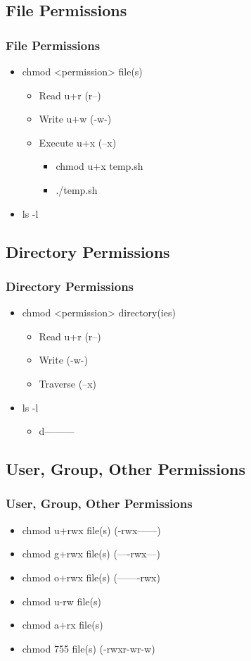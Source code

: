 \documentclass[hyperref={pdfpagelabels=false}]{beamer}
\begin{document}
\subsection{File Permissions}
\frame
{
    \frametitle{File Permissions}
    \begin{itemize}
    \item{chmod <permission> file(s)}
        \begin{itemize}
        \item{Read u+r (r--)}
        \item{Write u+w (-w-)}
        \item{Execute u+x (--x)}
            \begin{itemize}
            \item{chmod u+x temp.sh}
            \item{./temp.sh}
            \end{itemize}
        \end{itemize}
    \item{ls -l}
    \end{itemize}
}
\subsection{Directory Permissions}
\frame
{
    \frametitle{Directory Permissions}
    \begin{itemize}
    \item{chmod <permission> directory(ies)}
        \begin{itemize}
        \item{Read u+r (r--)}
        \item{Write (-w-)}
        \item{Traverse (--x)}
        \end{itemize}
    \item{ls -l}
        \begin{itemize}
        \item{d---------}
        \end{itemize}
    \end{itemize}
}
\subsection{User, Group, Other Permissions}
\frame
{
    \frametitle{User, Group, Other Permissions}
    \begin{itemize}
    \item{chmod u+rwx file(s) (-rwx------)}
    \item{chmod g+rwx file(s) (----rwx---)}
    \item{chmod o+rwx file(s) (-------rwx)}
    \end{itemize}
    \begin{itemize}
    \item{chmod u-rw file(s)}
    \item{chmod a+rx file(s)}
    \item{chmod 755 file(s) (-rwxr-wr-w)}
    \end{itemize}
}
\end{document}
